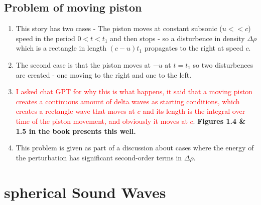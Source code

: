 ﻿\documentclass[11pt]{article}
\begin{document}
\subsection{Problem of moving piston}
\begin{enumerate}
  \item This story has two cases - The piston moves at constant subsonic ($u << c$) speed in the period $0 < t < t_1$ and then stops - so a disturbence in density $\Delta \rho$ which is a rectangle in length $(c-u)t_1$ propagates to the right at speed $c$.
    \item The second case is that the piston moves at $-u$ at $t=t_1$ so two disturbences are created - one moving to the right and one to the left.
    \item \textcolor{red}{I asked chat GPT for why this is what happens, it said that a moving piston creates a continuous amount of delta waves as starting conditions, which creates a rectangle wave that moves at $c$ and its length is the integral over time of the piston movement, and obviously it moves at $c$}.
      \textbf{Figures 1.4 \& 1.5 in the book presents this well.}
      \item This problem is given as part of a discussion about cases where the energy of the perturbation has significant second-order terms in $\Delta \rho$.
\end{enumerate}
\section{spherical Sound Waves}
\end{document}
